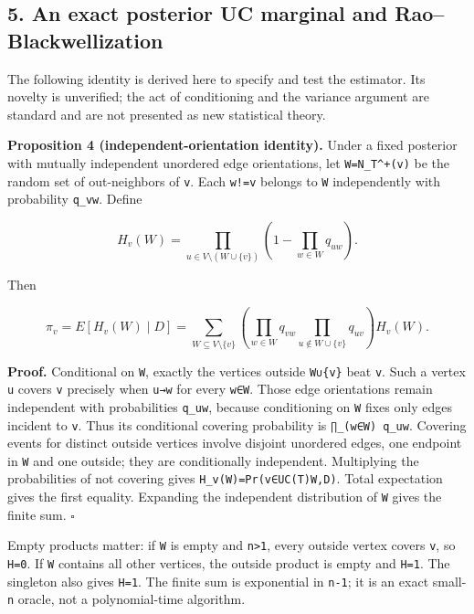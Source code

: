 \documentclass[
  11pt,
]{article}
\begin{document}
\hypertarget{an-exact-posterior-uc-marginal-and-raoblackwellization}{%
\subsection{5. An exact posterior UC marginal and
Rao--Blackwellization}\label{an-exact-posterior-uc-marginal-and-raoblackwellization}}

The following identity is derived here to specify and test the
estimator. Its novelty is unverified; the act of conditioning and the
variance argument are standard and are not presented as new statistical
theory.

\textbf{Proposition 4 (independent-orientation identity).} Under a fixed
posterior with mutually independent unordered edge orientations, let
\texttt{W=N\_T\^{}+(v)} be the random set of out-neighbors of
\texttt{v}. Each \texttt{w!=v} belongs to \texttt{W} independently with
probability \texttt{q\_vw}. Define

\[
H_v(W)=\prod_{u\in V\setminus(W\cup\{v\})}
\left(1-\prod_{w\in W}q_{uw}\right).
\]

Then

\[
\pi_v=E[H_v(W)\mid D]
=\sum_{W\subseteq V\setminus\{v\}}
\left(\prod_{w\in W}q_{vw}\prod_{u\notin W\cup\{v\}}q_{uv}\right)H_v(W).
\]

\textbf{Proof.} Conditional on \texttt{W}, exactly the vertices outside
\texttt{W∪\{v\}} beat \texttt{v}. Such a vertex \texttt{u} covers
\texttt{v} precisely when \texttt{u→w} for every \texttt{w∈W}. Those
edge orientations remain independent with probabilities \texttt{q\_uw},
because conditioning on \texttt{W} fixes only edges incident to
\texttt{v}. Thus its conditional covering probability is
\texttt{∏\_(w∈W)\ q\_uw}. Covering events for distinct outside vertices
involve disjoint unordered edges, one endpoint in \texttt{W} and one
outside; they are conditionally independent. Multiplying the
probabilities of not covering gives
\texttt{H\_v(W)=Pr(v∈UC(T)\textbar{}W,D)}. Total expectation gives the
first equality. Expanding the independent distribution of \texttt{W}
gives the finite sum. \(\square\)

Empty products matter: if \texttt{W} is empty and
\texttt{n\textgreater{}1}, every outside vertex covers \texttt{v}, so
\texttt{H=0}. If \texttt{W} contains all other vertices, the outside
product is empty and \texttt{H=1}. The singleton also gives
\texttt{H=1}. The finite sum is exponential in \texttt{n-1}; it is an
exact small-\texttt{n} oracle, not a polynomial-time algorithm.
\end{document}
